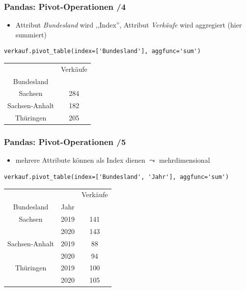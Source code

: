 \begin{frame}[fragile]
  \frametitle{Pandas: Pivot-Operationen /4}

  \begin{itemize}
\item Attribut \emph{Bundesland} wird ,,Index'', Attribut \emph{Verkäufe} wird aggregiert (hier summiert) 
  \end{itemize}

\begin{verbatim}
verkauf.pivot_table(index=['Bundesland'], aggfunc='sum')
\end{verbatim}

\begin{center}
  \begin{tabular}{|c||c|}
  \hline
  \rowcolor{Gray}  & Verkäufe \\
  \rowcolor{Gray} Bundesland & \\
  \hline \hline
Sachsen        & 284 \\
Sachsen-Anhalt &  182 \\
Thüringen      &  205 \\
\hline 
  \end{tabular}
\end{center}

\end{frame}

\begin{frame}[fragile]
  \frametitle{Pandas: Pivot-Operationen /5}

  \begin{itemize}
\item mehrere Attribute können als Index dienen $\leadsto$ mehrdimensional
  \end{itemize}

\begin{verbatim}
verkauf.pivot_table(index=['Bundesland', 'Jahr'], aggfunc='sum')
\end{verbatim}

{\small
\begin{center}
  \begin{tabular}{|c|c||c|}
  \hline
  \rowcolor{Gray}  & & Verkäufe \\
  \rowcolor{Gray} Bundesland & Jahr & \\
  \hline \hline
Sachsen        & 2019 & 141 \\
               & 2020 & 143 \\
Sachsen-Anhalt &  2019 & 88 \\
               & 2020 & 94 \\
Thüringen      &  2019 & 100 \\
               & 2020 & 105 \\
\hline 
  \end{tabular}
\end{center}
}

\end{frame}

